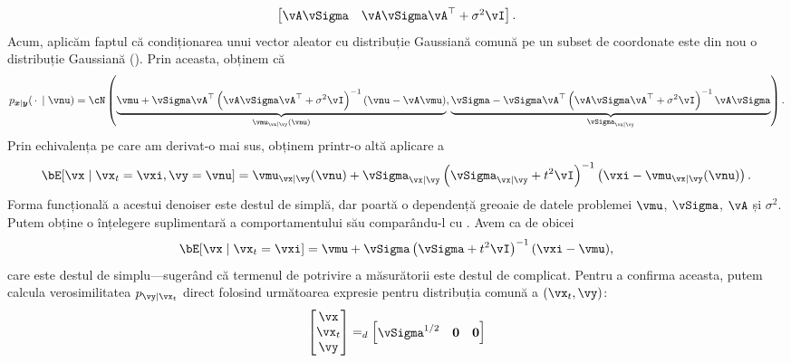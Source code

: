 \documentclass[../../book-main_ro.tex]{subfiles}
\begin{document}
\begin{example}
\begin{equation*}
\begin{bmatrix}
      \vA \vSigma & \vA \vSigma \vA^\top + \sigma^2 \vI
    \end{bmatrix}.
  \end{equation*}
  Acum, aplicăm faptul că condiționarea unui vector aleator cu distribuție Gaussiană comună
  pe un subset de coordonate este din nou o distribuție Gaussiană
  ().
  Prin aceasta, obținem că
  \begin{equation}
    p_{\x \mid \y}(\spcdot \mid \vnu) = \cN\left(
    \underbrace{%
      \vmu + \vSigma\vA^\top \left(\vA\vSigma\vA^\top + \sigma^2 \vI\right)^{-1} 
      (\vnu - \vA\vmu)}_{\vmu_{\vx \mid \vy}(\vnu)},
      \underbrace{%
      \vSigma - \vSigma \vA^\top \left(\vA\vSigma\vA^\top + \sigma^2
      \vI\right)^{-1} \vA \vSigma}_{\vSigma_{\vx\mid \vy}}
    \right).
  \end{equation}
  Prin echivalența pe care am derivat-o mai sus, obținem printr-o altă aplicare a
  \begin{equation}\label{eq:conditional-posterior-denoiser-gaussian-case}
    \bE[ \vx \mid \vx_t=\vxi, \vy=\vnu ]
    =
    \vmu_{\vx\mid \vy}(\vnu) + \vSigma_{\vx\mid\vy}\left(
    \vSigma_{\vx\mid \vy} + t^2 \vI 
    \right)^{-1}\left(
    \vxi - \vmu_{\vx\mid \vy}(\vnu)
    \right).
  \end{equation}
  Forma funcțională a acestui denoiser este destul de simplă, dar poartă o
  dependență greoaie de datele problemei $\vmu$, $\vSigma$, $\vA$ și
  $\sigma^2$.
  Putem obține o înțelegere suplimentară a comportamentului său comparându-l cu
  .
  Avem ca de obicei
  \begin{equation}\label{eq:posterior-denoiser-gaussian-case}
    \bE[\vx \mid \vx_t=\vxi]
    = \vmu + \vSigma\left(\vSigma + t^2 \vI\right)^{-1} (\vxi - \vmu),
  \end{equation}
  care este destul de simplu---sugerând că termenul de potrivire a măsurătorii este
  destul de complicat. Pentru a confirma aceasta, putem calcula verosimilitatea $p_{\vy
  \mid \vx_t}$ direct folosind următoarea expresie pentru distribuția comună
  a $(\vx_t, \vy)$:
  \begin{equation}
    \begin{bmatrix}
      \vx \\
      \vx_t \\
      \vy
    \end{bmatrix}
    =_{d}
    \begin{bmatrix}
      \vSigma^{1/2} & \Zero & \Zero \\

\end{bmatrix}
\end{equation}
\end{example}
\end{document}
